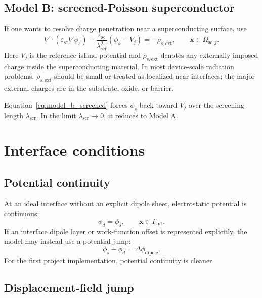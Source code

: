 \documentclass[11pt]{article}
\newcommand{\Gint}{\Gamma_{\mathrm{int}}}
\newcommand{\epssc}{\varepsilon_{\mathrm{sc}}}
\newcommand{\lams}{\lambda_{\mathrm{scr}}}
\begin{document}
\subsection{Model B: screened-Poisson superconductor}

If one wants to resolve charge penetration near a superconducting surface, use
\begin{equation}
\boxed{\nabla\cdot(\epssc\nabla\phi_s)-\frac{\epssc}{\lams^2}(\phi_s-V_j)=-\rho_{s,\mathrm{ext}},\qquad \mathbf{x}\in\Omega_{\mathrm{sc},j}.}
\label{eq:model_b_screened}
\end{equation}
Here $V_j$ is the reference island potential and $\rho_{s,\mathrm{ext}}$ denotes any externally imposed charge inside the superconducting material. In most device-scale radiation problems, $\rho_{s,\mathrm{ext}}$ should be small or treated as localized near interfaces; the major external charges are in the substrate, oxide, or barrier.

Equation~\eqref{eq:model_b_screened} forces $\phi_s$ back toward $V_j$ over the screening length $\lams$. In the limit $\lams\rightarrow 0$, it reduces to Model A.

\section{Interface conditions}

\subsection{Potential continuity}

At an ideal interface without an explicit dipole sheet, electrostatic potential is continuous:
\begin{equation}
\boxed{\phi_d = \phi_s,\qquad \mathbf{x}\in\Gint.}
\label{eq:interface_potential_continuity}
\end{equation}
If an interface dipole layer or work-function offset is represented explicitly, the model may instead use a potential jump:
\begin{equation}
\phi_s-\phi_d = \Delta\phi_{\mathrm{dipole}}.
\end{equation}
For the first project implementation, potential continuity is cleaner.

\subsection{Displacement-field jump}
\end{document}
